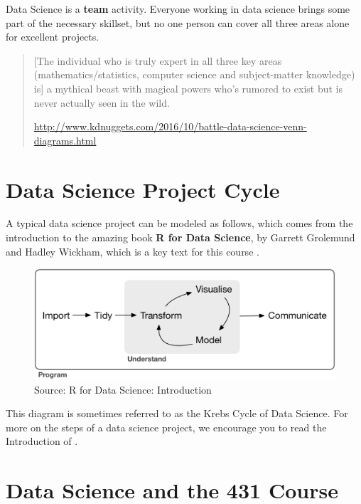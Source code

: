 \documentclass[
]{book}
\begin{document}
Data Science is a \textbf{team} activity. Everyone working in data science brings some part of the necessary skillset, but no one person can cover all three areas alone for excellent projects.

\begin{quote}
{[}The individual who is truly expert in all three key areas (mathematics/statistics, computer science and subject-matter knowledge) is{]} a mythical beast with magical powers who's rumored to exist but is never actually seen in the wild.

\url{http://www.kdnuggets.com/2016/10/battle-data-science-venn-diagrams.html}
\end{quote}

\hypertarget{data-science-project-cycle}{%
\section{Data Science Project Cycle}\label{data-science-project-cycle}}

A typical data science project can be modeled as follows, which comes from the introduction to the amazing book \textbf{R for Data Science}, by Garrett Grolemund and Hadley Wickham, which is a key text for this course \citep{R4DS}.

\begin{figure}
\includegraphics[width=0.95\linewidth]{figures/data-science-cycle} \caption{Source: R for Data Science: Introduction}\label{fig:cycle-fig}
\end{figure}

This diagram is sometimes referred to as the Krebs Cycle of Data Science. For more on the steps of a data science project, we encourage you to read the Introduction of \citet{R4DS}.

\hypertarget{data-science-and-the-431-course}{%
\section{Data Science and the 431 Course}\label{data-science-and-the-431-course}}
\end{document}
